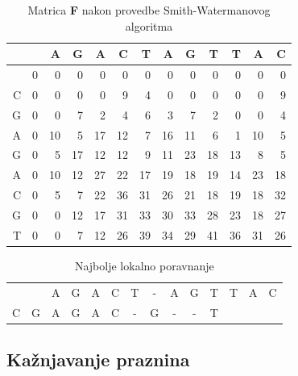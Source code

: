 \documentclass[times, utf8, zavrsni, numeric]{fer}
\begin{document}
\begin{table}[hbt]
\begin{center}
\begin{tabular}{| r | r r r r r r r r r r r r |}
\hline
 &  & A & G & A & C & T & A & G & T & T & A & C \\
\hline
  & 0 & 0 & 0 & 0 & 0 & 0 & 0 & 0 & 0 & 0 & 0 & 0 \\
C & 0 & 0 & 0 & 0 & 9 & 4 & 0 & 0 & 0 & 0 & 0 & 9 \\
G & 0 & 0 & 7 & 2 & 4 & 6 & 3 & 7 & 2 & 0 & 0 & 4 \\
A & 0 & \cellcolor{lightgray}10 & 5 & 17 & 12 & 7 & 16 & 11 & 6 & 1 & 10 & 5 \\
G & 0 & 5 & \cellcolor{lightgray}17 & 12 & 12 & 9 & 11 & 23 & 18 & 13 & 8 & 5 \\
A & 0 & 10 & 12 & \cellcolor{lightgray}27 & 22 & 17 & 19 & 18 & 19 & 14 & 23 & 18 \\
C & 0 & 5 & 7 & 22 & \cellcolor{lightgray}36 & \cellcolor{lightgray}31 & 26 & 21 & 18 & 19 & 18 & 32 \\
G & 0 & 0 & 12 & 17 & 31 & \cellcolor{lightgray}33 & \cellcolor{lightgray}30 & \cellcolor{lightgray}33 & 28 & 23 & 18 & 27 \\
T & 0 & 0 & 7 & 12 & 26 & 39 & 34 & 29 & \cellcolor{lightgray}41 & 36 & 31 & 26 \\
\hline
\end{tabular}
\end{center}
\caption{Matrica \textbf{F} nakon provedbe Smith-Watermanovog algoritma}
\label{table:swmatrica}
\end{table}

\begin{table}[hbt]
\begin{center}
\begin{tabular}{c c c c c c c c c c c c c c}
 & & A & G & A & C & T & - & A & G & T & \color{lightgray}T & \color{lightgray}A & \color{lightgray}C\\
\color{lightgray}C & \color{lightgray}G & A & G & A & C & - & G & - & - & T & & & \\
\end{tabular}
\end{center}
\caption{Najbolje lokalno poravnanje}
\label{table:swporavnanje}
\end{table}

\subsection{Kažnjavanje praznina}
\indent
\end{document}

